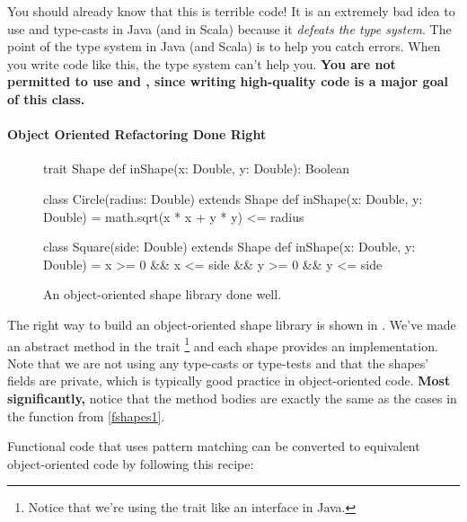 \documentclass{book}
\begin{document}
You should already know that this is terrible code! It is an extremely bad idea
to use  and type-casts in Java (and in Scala) because it
\emph{defeats the type system}. The point of the type system in Java (and Scala)
is to help you catch errors. When you write code like this, the type system
can't help you.
\textbf{You are not permitted to use  and ,
since writing high-quality code is a major goal of this class.}

\paragraph{Object Oriented Refactoring Done Right}

\begin{figure}
\begin{scalacode}
trait Shape {
  def inShape(x: Double, y: Double): Boolean
}

class Circle(radius: Double) extends Shape {
   def inShape(x: Double, y: Double) = math.sqrt(x * x + y * y) <= radius
}

class Square(side: Double) extends Shape {
  def inShape(x: Double, y: Double) = x >= 0 && x <= side && y >= 0 && y <= side
}
\end{scalacode}
\caption{An object-oriented shape library done well.}
\label{jshapes1}
\end{figure}

The right way to build an object-oriented shape library is shown in .
We've made
 an abstract method in the trait \footnote{Notice
that we're using the trait like an interface in Java.} and each shape provides
an implementation. Note that we are not using any type-casts or type-tests and
that the shapes' fields are private, which is typically good practice in
object-oriented code. \textbf{Most significantly,} notice that the method
bodies are exactly the same as the cases in the function from \cref{fshapes1}.

Functional code that uses pattern matching can be converted to equivalent
object-oriented code by following this recipe:
\end{document}
